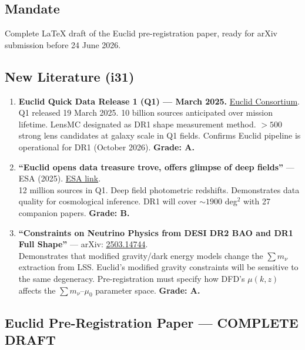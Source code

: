 \documentclass[11pt,a4paper]{article}
\begin{document}
\subsection{Mandate}
Complete LaTeX draft of the Euclid pre-registration paper, ready for arXiv submission before 24 June 2026.

\subsection{New Literature (i31)}

\begin{enumerate}
\item \textbf{Euclid Quick Data Release 1 (Q1) --- March 2025.} \href{https://www.euclid-ec.org/public/press-releases/euclid-quick-data-release-1/}{Euclid Consortium}.\\
Q1 released 19 March 2025. 10 billion sources anticipated over mission lifetime. LensMC designated as DR1 shape measurement method. $> 500$ strong lens candidates at galaxy scale in Q1 fields. Confirms Euclid pipeline is operational for DR1 (October 2026). \textbf{Grade: A.}

\item \textbf{``Euclid opens data treasure trove, offers glimpse of deep fields''} --- ESA (2025). \href{https://www.esa.int/Science_Exploration/Space_Science/Euclid/Euclid_opens_data_treasure_trove_offers_glimpse_of_deep_fields}{ESA link}.\\
12 million sources in Q1. Deep field photometric redshifts. Demonstrates data quality for cosmological inference. DR1 will cover $\sim 1900$ deg$^2$ with 27 companion papers. \textbf{Grade: B.}

\item \textbf{``Constraints on Neutrino Physics from DESI DR2 BAO and DR1 Full Shape''} --- arXiv: \href{https://arxiv.org/abs/2503.14744}{2503.14744}.\\
Demonstrates that modified gravity/dark energy models change the $\sum m_\nu$ extraction from LSS. Euclid's modified gravity constraints will be sensitive to the same degeneracy. Pre-registration must specify how DFD's $\mu(k,z)$ affects the $\sum m_\nu$--$\mu_0$ parameter space. \textbf{Grade: A.}
\end{enumerate}

\subsection{Euclid Pre-Registration Paper --- COMPLETE DRAFT}
\end{document}
